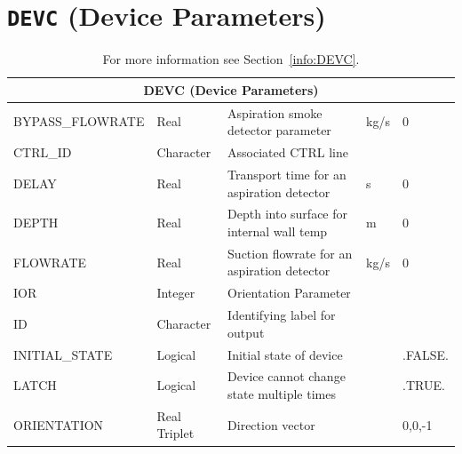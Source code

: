 \documentclass[11pt]{book}
\begin{document}
\vspace{\baselineskip}

\vfill


\section{\texorpdfstring{{\tt DEVC}}{DEVC} (Device Parameters)}

\hspace{1in}

\begin{table}[H]
\caption{For more information see Section~\ref{info:DEVC}.}\label{tbl:DEVC}
\noindent
\begin{tabular*}{\textwidth}{@{\extracolsep{\fill}}|l|l|l|l|l|}
\hline
\multicolumn{5}{|c|}{{\ct DEVC} (Device Parameters)} \\ \hline \hline
{\ct BYPASS\_FLOWRATE} & Real            & Aspiration smoke detector parameter                              & kg/s  & 0       \\ \hline
{\ct CTRL\_ID}         & Character       & Associated {\ct CTRL} line                                       &       &         \\ \hline
{\ct DELAY}            & Real            & Transport time for an aspiration detector                        & s     & 0       \\ \hline
{\ct DEPTH}            & Real            & Depth into surface for internal wall temp                        & m     & 0       \\ \hline
{\ct FLOWRATE}         & Real            & Suction flowrate for an aspiration detector                      & kg/s  & 0       \\ \hline
{\ct IOR}              & Integer         & Orientation Parameter                                            &       &         \\ \hline
{\ct ID}               & Character       & Identifying label for output                                     &       &         \\ \hline
{\ct INITIAL\_STATE}   & Logical         & Initial state of device                                          &       & .FALSE. \\ \hline
{\ct LATCH}            & Logical         & Device cannot change state multiple times                        &       & .TRUE.  \\ \hline
{\ct ORIENTATION}      & Real Triplet    & Direction vector                                                 &       & 0,0,-1  \\ \hline

\end{tabular*}
\end{table}
\end{document}
